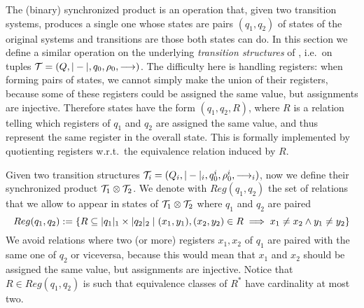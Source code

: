 \newcommand{\eq}[1]{#1}
\newcommand{\syncQ}{Q_{\syncp}}
\newcommand{\syncW}[1]{\weight{#1}_{\syncp}}
\newcommand{\syncAss}{\rho_0^{\syncp}}
\newcommand{\syncInit}{q_0^{\syncp}}
\newcommand{\syncTr}[1]{\xymatrix@C-=4ex{\ar[r]^{#1}&\!_{\syncp}}}
\newcommand{\syncHtr}[2]{\xymatrix@C-=4ex{\ar[r]^{#1}_{#2}&\!_{\syncp}}}
\newcommand{\regrule}{\textsc{(Reg)}}
\newcommand{\allrule}{\textsc{(Alloc)}}
\newcommand{\cproj}{\pi}

The (binary) synchronized product \cite{Arnold98} is an operation that, given two transition systems, produces a single one whose states are pairs $(q_1,q_2)$ of states of the original systems and transitions are those both states can do. In this section we define a similar operation on the underlying \emph{transition structures} of \hdmas{}, i.e.\ on tuples $\mathcal{T} = (Q,|-|,q_0,\rho_0,\longrightarrow)$. The difficulty here is handling registers: when forming pairs of states, we cannot simply make the union of their registers, because some of these registers could be assigned the same value, but assignments are injective. Therefore states have the form $(q_1,q_2,R)$, where $R$ is a relation telling which registers of $q_1$ and $q_2$ are assigned the same value, and thus represent the same register in the overall state. This is formally implemented by quotienting registers w.r.t.\ the equivalence relation induced by $R$.

Given two transition structures $\mathcal{T}_i = (Q_i,|-|_i,q_0^i,\rho_0^i,\longrightarrow_i)$, now we define their synchronized product $\mathcal{T}_1 \otimes \mathcal{T}_2$. We denote with
$Reg(q_1,q_2)$ the set of relations that we allow to appear in states of $\mathcal{T}_1 \otimes \mathcal{T}_2$ where $q_1$ and $q_2$ are paired
\[
	Reg(q_1,q_2) := \{ R \subseteq |q_1|_1 \times |q_2|_2 \mid (x_1,y_1),(x_2,y_2) \in R \implies x_1 \neq x_2 \land y_1 \neq y_2 \}
\]
We avoid relations where two (or more) registers $x_1,x_2$ of $q_1$ are paired with the same one of $q_2$ or viceversa, because this would mean that $x_1$ and $x_2$ should be assigned the same value, but assignments are injective. Notice that $R \in Reg(q_1,q_2)$ is such that equivalence classes of $R^*$ have cardinality at most two.


